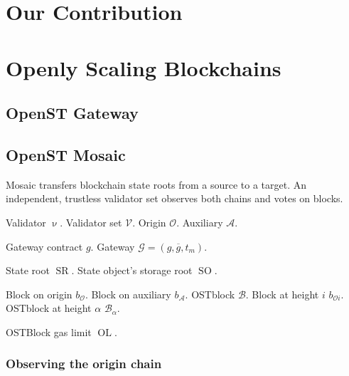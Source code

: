\documentclass[12pt,a4paper,draft]{article}
\newcommand{\SR}{\operatorname{SR}}
\newcommand{\SO}{\operatorname{SO}}
\newcommand{\OL}{\operatorname{OL}}
\begin{document}
\section{Our Contribution}

\section{Openly Scaling Blockchains}

\subsection{OpenST Gateway}
\label{subsec:gateway}


\subsection{OpenST Mosaic}

Mosaic transfers blockchain state roots from a source to a target.
An independent, trustless validator set observes both chains and votes on blocks.

%

Validator $\upnu$.
Validator set $\mathcal{V}$.
Origin $\mathcal{O}$.
Auxiliary $\mathcal{A}$.

Gateway contract $g$.
Gateway $\mathcal{G} = (g, \overline{g}, t_m)$.

State root $\SR$.
State object's storage root $\SO$.

Block on origin $b_\mathcal{O}$.
Block on auxiliary $b_\mathcal{A}$.
OSTblock $\mathcal{B}$.
Block at height $i$ $b_{\mathcal{O}i}$.
OSTblock at height $\alpha$ $\mathcal{B}_\alpha$.

OSTBlock gas limit $\OL$.

\subsubsection{Observing the origin chain}
\end{document}
